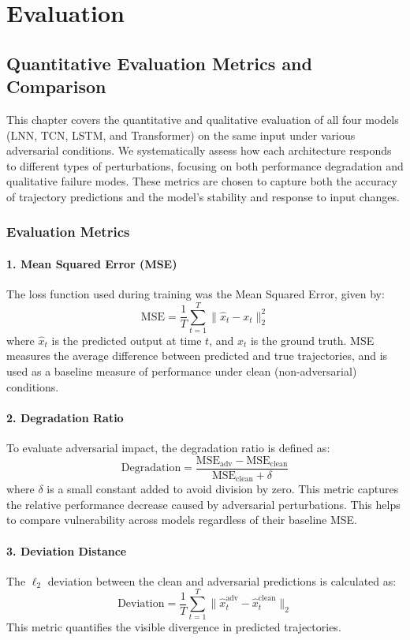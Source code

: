\chapter{Evaluation}

\section{Quantitative Evaluation Metrics and Comparison}

This chapter covers the quantitative and qualitative evaluation of all four models (LNN, TCN, LSTM, and Transformer) on the same input under various adversarial conditions. We systematically assess how each architecture responds to different types of perturbations, focusing on both performance degradation and qualitative failure modes. These metrics are chosen to capture both the accuracy of trajectory predictions and the model's stability and response to input changes.

\subsection{Evaluation Metrics}

\subsubsection*{1. Mean Squared Error (MSE)}
The loss function used during training was the Mean Squared Error, given by:
\[
\text{MSE} = \frac{1}{T} \sum_{t=1}^{T} \| \hat{x}_t - x_t \|_2^2
\]
where $\hat{x}_t$ is the predicted output at time $t$, and $x_t$ is the ground truth. MSE measures the average difference between predicted and true trajectories, and is used as a baseline measure of performance under clean (non-adversarial) conditions.

\subsubsection*{2. Degradation Ratio}
To evaluate adversarial impact, the degradation ratio is defined as:
\[
\text{Degradation} = \frac{\text{MSE}_{\text{adv}} - \text{MSE}_{\text{clean}}}{\text{MSE}_{\text{clean}} + \delta}
\]
where $\delta$ is a small constant added to avoid division by zero. This metric captures the relative performance decrease caused by adversarial perturbations. This helps to compare vulnerability across models regardless of their baseline MSE.

\subsubsection*{3. Deviation Distance}
The $\ell_2$ deviation between the clean and adversarial predictions is calculated as:
\[
\text{Deviation} = \frac{1}{T} \sum_{t=1}^{T} \| \hat{x}_t^{\text{adv}} - \hat{x}_t^{\text{clean}} \|_2
\]
This metric quantifies the visible divergence in predicted trajectories.


